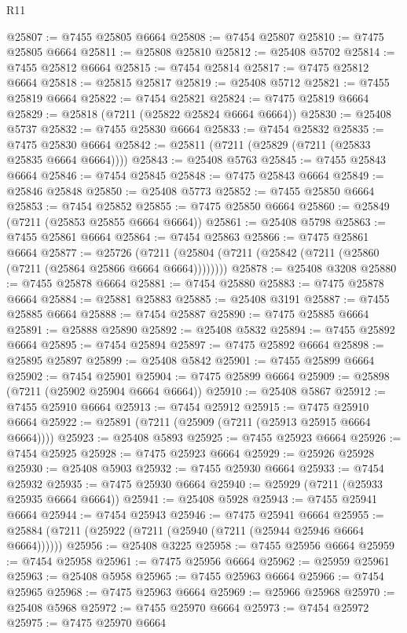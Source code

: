 \begin{lexlean}{R11}
\begin{coremodule}
@25807 := @7455 @25805 @6664
@25808 := @7454 @25807
@25810 := @7475 @25805 @6664
@25811 := @25808 @25810
@25812 := @25408 @5702
@25814 := @7455 @25812 @6664
@25815 := @7454 @25814
@25817 := @7475 @25812 @6664
@25818 := @25815 @25817
@25819 := @25408 @5712
@25821 := @7455 @25819 @6664
@25822 := @7454 @25821
@25824 := @7475 @25819 @6664
@25829 := @25818 (@7211 (@25822 @25824 @6664 @6664))
@25830 := @25408 @5737
@25832 := @7455 @25830 @6664
@25833 := @7454 @25832
@25835 := @7475 @25830 @6664
@25842 := @25811 (@7211 (@25829 (@7211 (@25833 @25835 @6664 @6664))))
@25843 := @25408 @5763
@25845 := @7455 @25843 @6664
@25846 := @7454 @25845
@25848 := @7475 @25843 @6664
@25849 := @25846 @25848
@25850 := @25408 @5773
@25852 := @7455 @25850 @6664
@25853 := @7454 @25852
@25855 := @7475 @25850 @6664
@25860 := @25849 (@7211 (@25853 @25855 @6664 @6664))
@25861 := @25408 @5798
@25863 := @7455 @25861 @6664
@25864 := @7454 @25863
@25866 := @7475 @25861 @6664
@25877 := @25726
    (@7211 (@25804 (@7211 (@25842 (@7211 (@25860 (@7211 (@25864 @25866 @6664 @6664))))))))
@25878 := @25408 @3208
@25880 := @7455 @25878 @6664
@25881 := @7454 @25880
@25883 := @7475 @25878 @6664
@25884 := @25881 @25883
@25885 := @25408 @3191
@25887 := @7455 @25885 @6664
@25888 := @7454 @25887
@25890 := @7475 @25885 @6664
@25891 := @25888 @25890
@25892 := @25408 @5832
@25894 := @7455 @25892 @6664
@25895 := @7454 @25894
@25897 := @7475 @25892 @6664
@25898 := @25895 @25897
@25899 := @25408 @5842
@25901 := @7455 @25899 @6664
@25902 := @7454 @25901
@25904 := @7475 @25899 @6664
@25909 := @25898 (@7211 (@25902 @25904 @6664 @6664))
@25910 := @25408 @5867
@25912 := @7455 @25910 @6664
@25913 := @7454 @25912
@25915 := @7475 @25910 @6664
@25922 := @25891 (@7211 (@25909 (@7211 (@25913 @25915 @6664 @6664))))
@25923 := @25408 @5893
@25925 := @7455 @25923 @6664
@25926 := @7454 @25925
@25928 := @7475 @25923 @6664
@25929 := @25926 @25928
@25930 := @25408 @5903
@25932 := @7455 @25930 @6664
@25933 := @7454 @25932
@25935 := @7475 @25930 @6664
@25940 := @25929 (@7211 (@25933 @25935 @6664 @6664))
@25941 := @25408 @5928
@25943 := @7455 @25941 @6664
@25944 := @7454 @25943
@25946 := @7475 @25941 @6664
@25955 := @25884 (@7211 (@25922 (@7211 (@25940 (@7211 (@25944 @25946 @6664 @6664))))))
@25956 := @25408 @3225
@25958 := @7455 @25956 @6664
@25959 := @7454 @25958
@25961 := @7475 @25956 @6664
@25962 := @25959 @25961
@25963 := @25408 @5958
@25965 := @7455 @25963 @6664
@25966 := @7454 @25965
@25968 := @7475 @25963 @6664
@25969 := @25966 @25968
@25970 := @25408 @5968
@25972 := @7455 @25970 @6664
@25973 := @7454 @25972
@25975 := @7475 @25970 @6664

\end{coremodule}
\end{lexlean}
